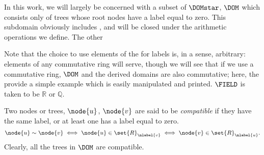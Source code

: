 In this work, we will largely be concerned with a subset of
$\DOMstar$, $\DOM$ which consists only of trees whose root nodes have
a label equal to zero. This subdomain obviously includes \tzerotree,
and will be closed under the arithmetic operations we define. The
other




Note that the choice to use elements of the \polytypes for labels is, in a
sense, arbitrary: elements of any commutative ring will serve, though
we will see that if we use a commutative ring, $\DOM$ and the derived
domains are also commutative; here, the \polytypes provide a
simple example which is easily manipulated and printed. 
$\FIELD$ is taken to be $\mathbb{R}$ or $\mathbb{Q}$.

\begin{definition}\label{compatibility}
Two nodes or trees, $\node{u}$, $\node{v}$ are said to be
\emph{compatible\/} if they have the same label, or at least one has
a label equal to zero.
\[
  \node{u} \sim \node{v} \iff  
  \node{u}\in\set{R}_{\nlabel{v}} \iff 
  \node{v}\in\set{R}_{\nlabel{u}}.
\]
Clearly, all the trees in $\DOM$ are compatible.
\end{definition}

